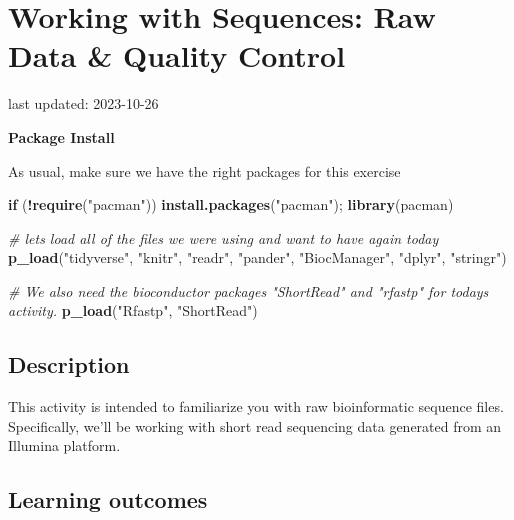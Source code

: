 \documentclass[
]{book}
\newenvironment{Shaded}{\begin{snugshade}}{\end{snugshade}}
\newcommand{\CommentTok}[1]{\textcolor[rgb]{0.56,0.35,0.01}{\textit{#1}}}
\newcommand{\ControlFlowTok}[1]{\textcolor[rgb]{0.13,0.29,0.53}{\textbf{#1}}}
\newcommand{\FunctionTok}[1]{\textcolor[rgb]{0.13,0.29,0.53}{\textbf{#1}}}
\newcommand{\NormalTok}[1]{#1}
\newcommand{\SpecialCharTok}[1]{\textcolor[rgb]{0.81,0.36,0.00}{\textbf{#1}}}
\newcommand{\StringTok}[1]{\textcolor[rgb]{0.31,0.60,0.02}{#1}}
\begin{document}
\hypertarget{working-with-sequences-raw-data-quality-control}{%
\chapter{Working with Sequences: Raw Data \& Quality Control}\label{working-with-sequences-raw-data-quality-control}}

last updated: 2023-10-26

\textbf{Package Install}

As usual, make sure we have the right packages for this exercise

\begin{Shaded}
\begin{Highlighting}[]
\ControlFlowTok{if}\NormalTok{ (}\SpecialCharTok{!}\FunctionTok{require}\NormalTok{(}\StringTok{"pacman"}\NormalTok{)) }\FunctionTok{install.packages}\NormalTok{(}\StringTok{"pacman"}\NormalTok{); }\FunctionTok{library}\NormalTok{(pacman)}

\CommentTok{\# let\textquotesingle{}s load all of the files we were using and want to have again today}
\FunctionTok{p\_load}\NormalTok{(}\StringTok{"tidyverse"}\NormalTok{, }\StringTok{"knitr"}\NormalTok{, }\StringTok{"readr"}\NormalTok{,}
       \StringTok{"pander"}\NormalTok{, }\StringTok{"BiocManager"}\NormalTok{, }
       \StringTok{"dplyr"}\NormalTok{, }\StringTok{"stringr"}\NormalTok{)}

\CommentTok{\# We also need the bioconductor packages "ShortRead" and "rfastp" for today\textquotesingle{}s activity.}
\FunctionTok{p\_load}\NormalTok{(}\StringTok{"Rfastp"}\NormalTok{, }\StringTok{"ShortRead"}\NormalTok{)}
\end{Highlighting}
\end{Shaded}

\hypertarget{description-1}{%
\section{Description}\label{description-1}}

This activity is intended to familiarize you with raw bioinformatic sequence files. Specifically, we'll be working with short read sequencing data generated from an Illumina platform.

\hypertarget{learning-outcomes-2}{%
\section{Learning outcomes}\label{learning-outcomes-2}}
\end{document}
